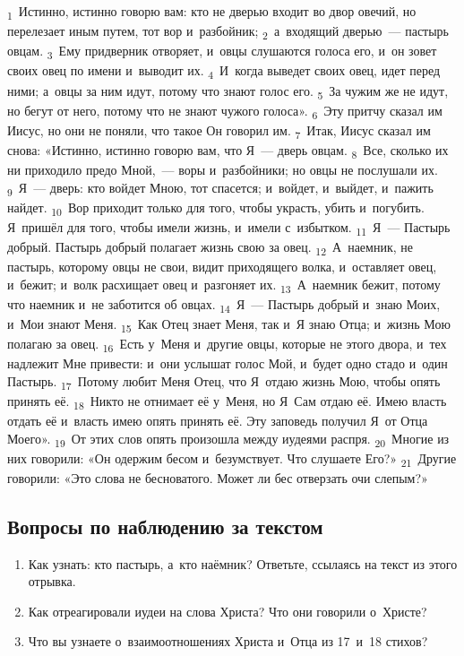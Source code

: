 \documentclass[a4paper,12pt]{article}
\begin{document}
\textsubscript{1}~Истинно, истинно говорю вам: кто не дверью входит во двор овечий, но перелезает иным путем, тот вор и~разбойник;
\textsubscript{2}~а~входящий дверью~--- пастырь овцам.
\textsubscript{3}~Ему придверник отворяет, и~овцы слушаются голоса его, и~он зовет своих овец по имени и~выводит их.
\textsubscript{4}~И~когда выведет своих овец, идет перед ними; а~овцы за ним идут, потому что знают голос его.
\textsubscript{5}~За чужим же не идут, но бегут от него, потому что не знают чужого голоса».
\textsubscript{6}~Эту притчу сказал им Иисус, но они не поняли, что такое Он говорил им.
\textsubscript{7}~Итак, Иисус сказал им снова: «Истинно, истинно говорю вам, что Я~— дверь овцам.
\textsubscript{8}~Все, сколько их ни приходило предо Мной,~--- воры и~разбойники; но овцы не послушали их.
\textsubscript{9}~Я~— дверь: кто войдет Мною, тот спасется; и~войдет, и~выйдет, и~пажить найдет.
\textsubscript{10}~Вор приходит только для того, чтобы украсть, убить и~погубить. Я~пришёл для того, чтобы имели жизнь, и~имели с~избытком.
\textsubscript{11}~Я~— Пастырь добрый. Пастырь добрый полагает жизнь свою за овец.
\textsubscript{12}~А~наемник, не пастырь, которому овцы не свои, видит приходящего волка, и~оставляет овец, и~бежит; и~волк расхищает овец и~разгоняет их.
\textsubscript{13}~А~наемник бежит, потому что наемник и~не заботится об овцах.
\textsubscript{14}~Я~— Пастырь добрый и~знаю Моих, и~Мои знают Меня.
\textsubscript{15}~Как Отец знает Меня, так и~Я знаю Отца; и~жизнь Мою полагаю за овец.
\textsubscript{16}~Есть у~Меня и~другие овцы, которые не этого двора, и~тех надлежит Мне привести: и~они услышат голос Мой, и~будет одно стадо и~один Пастырь.
\textsubscript{17}~Потому любит Меня Отец, что Я~отдаю жизнь Мою, чтобы опять принять её.
\textsubscript{18}~Никто не отнимает её у~Меня, но Я~Сам отдаю её. Имею власть отдать её и~власть имею опять принять её. Эту заповедь получил Я~от Отца Моего».
\textsubscript{19}~От этих слов опять произошла между иудеями распря.
\textsubscript{20}~Многие из них говорили: «Он одержим бесом и~безумствует. Что слушаете Его?»
\textsubscript{21}~Другие говорили: «Это слова не бесноватого. Может ли бес отверзать очи слепым?» 

\subsection*{Вопросы по наблюдению за текстом}
\begin{enumerate}
    \item Как узнать: кто пастырь, а~кто наёмник? Ответьте, ссылаясь на текст из этого отрывка. 
    
    \myline
    
    \myline
    \item Как отреагировали иудеи на слова Христа? Что они говорили о~Христе? 
    
    \myline
    
    \myline
    \item Что вы узнаете о~взаимоотношениях Христа и~Отца из 17~и~18 стихов? 
    
    \myline
    
    \myline
\end{enumerate}
\end{document}
